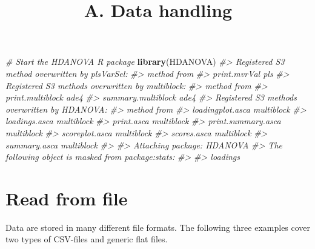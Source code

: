 \documentclass[
]{article}
\title{A. Data handling}
\author{}
\date{\vspace{-2.5em}}
\newenvironment{Shaded}{\begin{snugshade}}{\end{snugshade}}
\newcommand{\CommentTok}[1]{\textcolor[rgb]{0.56,0.35,0.01}{\textit{#1}}}
\newcommand{\FunctionTok}[1]{\textcolor[rgb]{0.13,0.29,0.53}{\textbf{#1}}}
\newcommand{\NormalTok}[1]{#1}
\begin{document}
\maketitle

\begin{Shaded}
\begin{Highlighting}[]
\CommentTok{\# Start the HDANOVA R package}
\FunctionTok{library}\NormalTok{(HDANOVA)}
\CommentTok{\#\textgreater{} Registered S3 method overwritten by \textquotesingle{}plsVarSel\textquotesingle{}:}
\CommentTok{\#\textgreater{}   method       from}
\CommentTok{\#\textgreater{}   print.mvrVal pls}
\CommentTok{\#\textgreater{} Registered S3 methods overwritten by \textquotesingle{}multiblock\textquotesingle{}:}
\CommentTok{\#\textgreater{}   method             from}
\CommentTok{\#\textgreater{}   print.multiblock   ade4}
\CommentTok{\#\textgreater{}   summary.multiblock ade4}
\CommentTok{\#\textgreater{} Registered S3 methods overwritten by \textquotesingle{}HDANOVA\textquotesingle{}:}
\CommentTok{\#\textgreater{}   method             from      }
\CommentTok{\#\textgreater{}   loadingplot.asca   multiblock}
\CommentTok{\#\textgreater{}   loadings.asca      multiblock}
\CommentTok{\#\textgreater{}   print.asca         multiblock}
\CommentTok{\#\textgreater{}   print.summary.asca multiblock}
\CommentTok{\#\textgreater{}   scoreplot.asca     multiblock}
\CommentTok{\#\textgreater{}   scores.asca        multiblock}
\CommentTok{\#\textgreater{}   summary.asca       multiblock}
\CommentTok{\#\textgreater{} }
\CommentTok{\#\textgreater{} Attaching package: \textquotesingle{}HDANOVA\textquotesingle{}}
\CommentTok{\#\textgreater{} The following object is masked from \textquotesingle{}package:stats\textquotesingle{}:}
\CommentTok{\#\textgreater{} }
\CommentTok{\#\textgreater{}     loadings}
\end{Highlighting}
\end{Shaded}

\hypertarget{read-from-file}{%
\section{Read from file}\label{read-from-file}}

Data are stored in many different file formats. The following three
examples cover two types of CSV-files and generic flat files.
\end{document}
